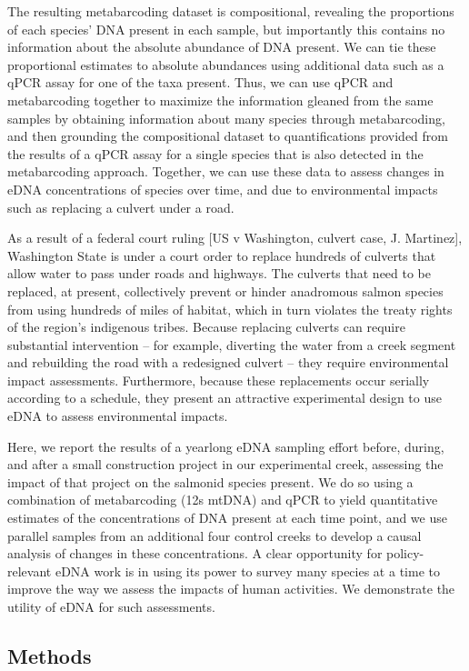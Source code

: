 \documentclass[
]{article}
\begin{document}
The resulting metabarcoding dataset is compositional, revealing the
proportions of each species' DNA present in each sample, but importantly
this contains no information about the absolute abundance of DNA
present. We can tie these proportional estimates to absolute abundances
using additional data such as a qPCR assay for one of the taxa present.
Thus, we can use qPCR and metabarcoding together to maximize the
information gleaned from the same samples by obtaining information about
many species through metabarcoding, and then grounding the compositional
dataset to quantifications provided from the results of a qPCR assay for
a single species that is also detected in the metabarcoding approach.
Together, we can use these data to assess changes in eDNA concentrations
of species over time, and due to environmental impacts such as replacing
a culvert under a road.

As a result of a federal court ruling {[}US v Washington, culvert case,
J. Martinez{]}, Washington State is under a court order to replace
hundreds of culverts that allow water to pass under roads and highways.
The culverts that need to be replaced, at present, collectively prevent
or hinder anadromous salmon species from using hundreds of miles of
habitat, which in turn violates the treaty rights of the region's
indigenous tribes. Because replacing culverts can require substantial
intervention -- for example, diverting the water from a creek segment
and rebuilding the road with a redesigned culvert -- they require
environmental impact assessments. Furthermore, because these
replacements occur serially according to a schedule, they present an
attractive experimental design to use eDNA to assess environmental
impacts.

Here, we report the results of a yearlong eDNA sampling effort before,
during, and after a small construction project in our experimental
creek, assessing the impact of that project on the salmonid species
present. We do so using a combination of metabarcoding (12s mtDNA) and
qPCR to yield quantitative estimates of the concentrations of DNA
present at each time point, and we use parallel samples from an
additional four control creeks to develop a causal analysis of changes
in these concentrations. A clear opportunity for policy-relevant eDNA
work is in using its power to survey many species at a time to improve
the way we assess the impacts of human activities. We demonstrate the
utility of eDNA for such assessments.

\hypertarget{methods}{%
\subsection{Methods}\label{methods}}
\end{document}

